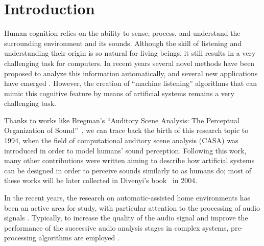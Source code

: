\chapter{Introduction}\label{ch:intro}

Human cognition relies on the ability to sense, process, and understand the surrounding environment and its sounds.
Although the skill of listening and understanding their origin is so natural for living beings, it still results in a very challenging task for computers. In recent years several novel methods have been proposed to analyze this information automatically, and several new applications have emerged \cite{virtanen2018computational}. However, the creation of ``machine listening'' algorithms that can mimic this cognitive feature by means of artificial systems remains a very challenging task. 

Thanks to works like Bregman's ``Auditory Scene Analysis: The Perceptual Organization of Sound''~\cite{bregman1994auditory}, we can trace back the birth of this research topic to 1994, when the field of computational auditory scene analysis (CASA) was introduced in order to model humans' sound perception. Following this work, many other contributions were written aiming to describe how artificial systems can be designed in order to perceive sounds similarly to as humans do; most of these works will be later collected in Divenyi's book~\cite{divenyi2004speech} in 2004. 

In the recent years, the research on automatic-assisted home environments has been an active area for study, with particular attention to the processing of audio signals \cite{Gemmeke13,Vacher2015,Principi2015a}. Typically, to increase the quality of the audio signal and improve the performance of the successive audio analysis stages in complex systems, pre-processing algorithms are employed \cite{loizou2013speech,Hussain2007,Rotili12b}.

